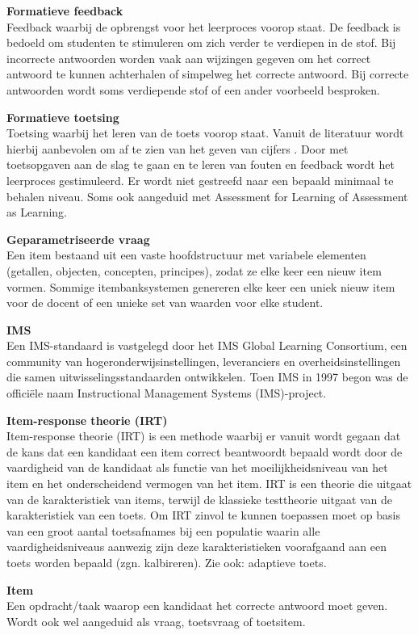 \documentclass[
]{book}
\begin{document}
\textbf{Formatieve feedback}\\
Feedback waarbij de opbrengst voor het leerproces voorop staat. De feedback is bedoeld om studenten te stimuleren om zich verder te verdiepen in de stof. Bij incorrecte antwoorden worden vaak aan wijzingen gegeven om het correct antwoord te kunnen achterhalen of simpelweg het correcte antwoord. Bij correcte antwoorden wordt soms verdiepende stof of een ander voorbeeld besproken.

\textbf{Formatieve toetsing}\\
Toetsing waarbij het leren van de toets voorop staat. Vanuit de literatuur wordt hierbij aanbevolen om af te zien van het geven van cijfers . Door met toetsopgaven aan de slag te gaan en te leren van fouten en feedback wordt het leerproces gestimuleerd. Er wordt niet gestreefd naar een bepaald minimaal te behalen niveau. Soms ook aangeduid met Assessment for Learning of Assessment as Learning.

\textbf{Geparametriseerde vraag}\\
Een item bestaand uit een vaste hoofdstructuur met variabele elementen (getallen, objecten, concepten, principes), zodat ze elke keer een nieuw item vormen. Sommige itembanksystemen genereren elke keer een uniek nieuw item voor de docent of een unieke set van waarden voor elke student.

\textbf{IMS}\\
Een IMS-standaard is vastgelegd door het IMS Global Learning Consortium, een community van hogeronderwijsinstellingen, leveranciers en overheidsinstellingen die samen uitwisselingsstandaarden ontwikkelen. Toen IMS in 1997 begon was de officiële naam Instructional Management Systems (IMS)-project.

\textbf{Item-response theorie (IRT)}\\
Item-response theorie (IRT) is een methode waarbij er vanuit wordt gegaan dat de kans dat een kandidaat een item correct beantwoordt bepaald wordt door de vaardigheid van de kandidaat als functie van het moeilijkheidsniveau van het item en het onderscheidend vermogen van het item. IRT is een theorie die uitgaat van de karakteristiek van items, terwijl de klassieke testtheorie uitgaat van de karakteristiek van een toets. Om IRT zinvol te kunnen toepassen moet op basis van een groot aantal toetsafnames bij een populatie waarin alle vaardigheidsniveaus aanwezig zijn deze karakteristieken voorafgaand aan een toets worden bepaald (zgn. kalbireren). Zie ook: adaptieve toets.

\textbf{Item}\\
Een opdracht/taak waarop een kandidaat het correcte antwoord moet geven. Wordt ook wel aangeduid als vraag, toetsvraag of toetsitem.
\end{document}

